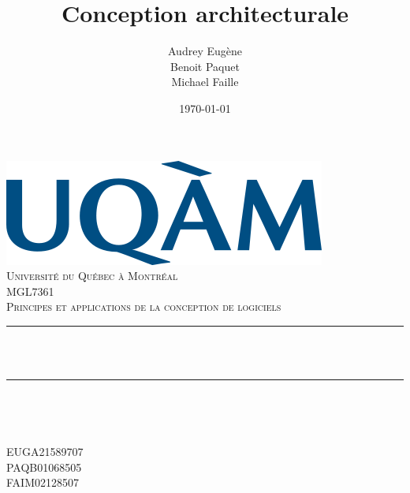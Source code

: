 \documentclass[12pt]{article}
\title{Conception architecturale}								%
\author{Audrey Eugène \\ Benoit Paquet \\ Michael Faille}								%
\date{\today}											%
\makeatletter
\let\thetitle\@title
\let\theauthor\@author
\let\thedate\@date
\makeatother
\begin{document}

\begin{titlepage}
	\centering
    \vspace*{0.5 cm}
    \includegraphics[scale = 0.75]{Logo_UQAM.png}\\[1.0 cm]	%
    \textsc{\LARGE Université du Québec à Montréal}\\[2.0 cm]	%
	\textsc{\Large MGL7361}\\[0.5 cm]				%
	\textsc{\large Principes et applications de la conception de logiciels}\\[0.5 cm]				%
	\rule{\linewidth}{0.2 mm} \\[0.4 cm]
	{ \huge \bfseries \thetitle}\\
	\rule{\linewidth}{0.2 mm} \\[1.5 cm]
	
	\begin{minipage}{0.4\textwidth}
		\begin{flushleft} \large
			\theauthor
			\end{flushleft}
			\end{minipage}~
			\begin{minipage}{0.4\textwidth}
			\begin{flushright} \large
			EUGA21589707 \\
			PAQB01068505 \\
			FAIM02128507 \\
		\end{flushright}
	\end{minipage}\\[2 cm]
	
	{\large \thedate}\\[2 cm]
 
	\vfill
	
\end{titlepage}


\tableofcontents
\pagebreak
\end{document}
